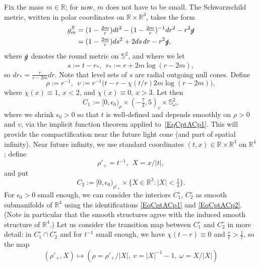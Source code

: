 \documentclass[reqno,11pt,letterpaper]{amsart}
\numberwithin{equation}{section}
\numberwithin{figure}{section}
\theoremstyle{definition}
\theoremstyle{remark}
\newcommand{\R}{\mathbb{R}}
\newcommand{\Sph}{\mathbb{S}}
\newcommand{\slg}{\slashed{g}{}}
\newcommand{\eps}{\epsilon}
\begin{document}
Fix the mass $m\in\R$; for now, $m$ does not have to be small. The Schwarzschild metric, written in polar coordinates on $\R\times\R^3$, takes the form
\begin{align}
  g_m^S &= (1-\tfrac{2 m}{r})dt^2 - (1-\tfrac{2 m}{r})^{-1}dr^2 - r^2\slg \nonumber\\
\label{EqCptASchw}
        &= (1-\tfrac{2 m}{r})ds^2 + 2 ds\,dr - r^2\slg,
\end{align}
where $\slg$ denotes the round metric on $\Sph^2$, and where we let
\begin{equation}
\label{EqCptARstar}
  s := t-r_*,\ \ r_* := r + 2 m\log(r-2 m),
\end{equation}
so $dr_*=\tfrac{r}{r-2 m}dr$. Note that level sets of $s$ are radial outgoing null cones. Define
\begin{equation}
\label{EqCptACp1}
  \rho := r^{-1}, \ \ v := r^{-1}\bigl(t - r - \chi(t/r)2 m\log(r-2 m)\bigr),
\end{equation}
where $\chi(x)\equiv 1$, $x<2$, and $\chi(x)\equiv 0$, $x>3$. Let then
\begin{equation}
\label{EqCptACp1Space}
  C_1 := [0,\eps_0)_\rho \times (-\tfrac74,5)_v \times \Sph^2_\omega,
\end{equation}
where we shrink $\eps_0>0$ so that $t$ is well-defined and depends smoothly on $\rho>0$ and $v$, via the implicit function theorem applied to~\eqref{EqCptACp1}. This will provide the compactification near the future light cone (and part of spatial infinity). Near future infinity, we use standard coordinates $(t,x)\in\R\times\R^3$ on $\R^4$; define
\begin{equation}
\label{EqCptACp2}
  \rho'_+=t^{-1}, \ \ X=x/|t|,
\end{equation}
and put
\begin{equation}
\label{EqCptACp2Space}
  C_2 := [0,\eps_0)_{\rho'_+} \times \{ X\in\R^3 \colon |X|<\tfrac14 \}.
\end{equation}
For $\eps_0>0$ small enough, we can consider the interiors $C_1^\circ$, $C_2^\circ$ as smooth submanifolds of $\R^4$ using the identifications \eqref{EqCptACp1} and \eqref{EqCptACp2}. (Note in particular that the smooth structures agree with the induced smooth structure of $\R^4$.) Let us consider the transition map between $C_1^\circ$ and $C_2^\circ$ in more detail: in $C_1^\circ\cap C_2^\circ$ and for $t^{-1}$ small enough, we have $\chi(t-r)\equiv 0$ and $\tfrac{r}{t}>\tfrac17$, so the map
\begin{equation}
\label{EqCptACp12}
  (\rho'_+,X) \mapsto (\rho=\rho'_+ / |X|,\ v=|X|^{-1}-1,\ \omega=X/|X|)
\end{equation}
\end{document}
